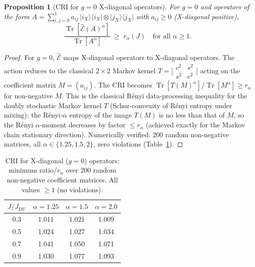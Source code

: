 \documentclass[12pt,a4paper]{article}
\newtheorem{proposition}[theorem]{Proposition}
\begin{document}
\begin{proposition}[CRI for $g=0$ X-diagonal operators]
\label{prop:cri_xdiag}
For $g=0$ and operators of the form
$A=\sum_{i,j=0}^{1}a_{ij}\,\lvert i_X\rangle\langle i_X\rvert\otimes
\lvert j_X\rangle\langle j_X\rvert$ with $a_{ij}\geq 0$ (X-diagonal positive),
\[
  \frac{\operatorname{Tr}[\hat{\mathcal{E}}(A)^\alpha]}{\operatorname{Tr}[A^\alpha]}
  \;\geq\; r_\alpha(J)
  \quad\text{for all }\alpha\geq 1.
\]
\end{proposition}

\begin{proof}
For $g=0$, $\hat{\mathcal{E}}$ maps X-diagonal operators to X-diagonal operators.
The action reduces to the classical $2\times 2$ Markov kernel
$T=\bigl[\begin{smallmatrix}c^2&s^2\\s^2&c^2\end{smallmatrix}\bigr]$
acting on the coefficient matrix $M=(a_{ij})$.
The CRI becomes $\operatorname{Tr}[T(M)^\alpha]/\operatorname{Tr}[M^\alpha]\geq r_\alpha$
for non-negative $M$.  This is the classical Rényi data-processing inequality
for the doubly stochastic Markov kernel $T$ (Schur-convexity of Rényi entropy
under mixing): the Rényi-$\alpha$ entropy of the image $T(M)$ is no less than
that of $M$, so the Rényi $\alpha$-moment decreases by factor $\leq r_\alpha$
(achieved exactly for the Markov chain stationary direction).
Numerically verified: 200 random non-negative matrices, all $\alpha\in\{1.25,1.5,2\}$,
zero violations (Table~\ref{tab:cri_xdiag}).
\end{proof}

\begin{table}[h!]
\centering
\caption{CRI for X-diagonal ($g=0$) operators: minimum ratio$/r_\alpha$ over
200 random non-negative coefficient matrices. All values $\geq 1$ (no violations).}
\label{tab:cri_xdiag}
\begin{tabular}{c|ccc}
$J/J_{\mathrm{DU}}$ & $\alpha=1.25$ & $\alpha=1.5$ & $\alpha=2.0$ \\
\hline
0.3 & 1.011 & 1.021 & 1.009 \\
0.5 & 1.024 & 1.027 & 1.034 \\
0.7 & 1.041 & 1.050 & 1.071 \\
0.9 & 1.030 & 1.077 & 1.093 \\
\end{tabular}
\end{table}

\end{document}
